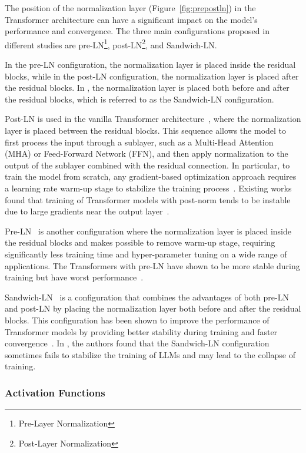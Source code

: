 The position of the normalization layer (Figure~\ref{fig:prepostln}) in the Transformer architecture can have a significant impact on the model's performance and convergence.
The three main configurations proposed in different studies are pre-LN\footnote{Pre-Layer Normalization}, post-LN\footnote{Post-Layer Normalization}, and Sandwich-LN\@.

In the pre-LN configuration, the normalization layer is placed inside the residual blocks, while in the post-LN configuration, the normalization layer is placed after the residual blocks.
In \textcite{ding2021cogview}, the normalization layer is placed both before and after the residual blocks, which is referred to as the Sandwich-LN configuration.

Post-LN is used in the vanilla Transformer architecture~\cite{vaswani2023attention}, where the normalization layer is placed between the residual blocks.
This sequence allows the model to first process the input through a sublayer, such as a Multi-Head Attention (MHA) or Feed-Forward Network (FFN), and then apply normalization to the output of the sublayer combined with the residual connection.
In particular, to train the model from scratch, any gradient-based optimization approach requires a learning rate warm-up stage to stabilize the training process~\cite{vaswani2023attention}.
Existing works found that training of Transformer models with post-norm tends to be instable due to large gradients near the output layer~\cite{xiong2020layer}.

Pre-LN~\cite{baevski2019adaptive} is another configuration where the normalization layer is placed inside the residual blocks and makes possible to remove warm-up stage, requiring significantly less training time and hyper-parameter tuning on a wide range of applications.
The Transformers with pre-LN have shown to be more stable during training but have worst performance~\cite{liu2020understanding}.

Sandwich-LN~\cite{ding2021cogview} is a configuration that combines the advantages of both pre-LN and post-LN by placing the normalization layer both before and after the residual blocks.
This configuration has been shown to improve the performance of Transformer models by providing better stability during training and faster convergence~\cite{ding2021cogview}.
In \textcite{zeng2022glm130b}, the authors found that the Sandwich-LN configuration sometimes fails to stabilize the training of LLMs and may lead to the collapse of training.

\subsubsection{Activation Functions}
\label{subsubsec:activation-functions}

